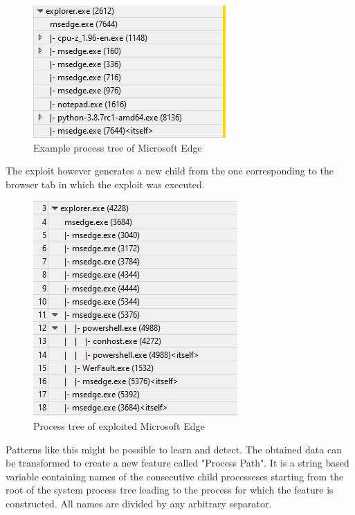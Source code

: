 \documentclass[a4paper,twoside,12pt]{book}
\begin{document}
\begin{figure}
	\centering
	\includegraphics{images/wpa_normal}
	\caption{Example process tree of Microsoft Edge}
	\label{fig:WPAnormal}
 \end{figure}

The exploit however generates a new child from the one corresponding to the browser tab 
in which the exploit was executed. 

\begin{figure}
	\centering
	\includegraphics{images/wpa_exploit}
	\caption{Process tree of exploited Microsoft Edge}
	\label{fig:WPAexploit}
 \end{figure}

Patterns like this might be possible to learn and detect. The obtained data can be transformed
to create a new feature called "Process Path". It is a string based variable containing names 
of the consecutive child processeses starting from the root of the system process tree leading to the 
process for which the feature is constructed. All names are divided by any arbitrary separator. 

\end{document}
